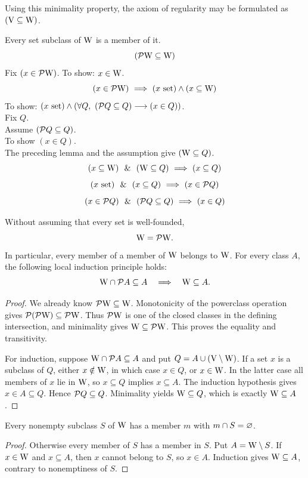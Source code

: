 \begin{note}
Using this minimality property, the axiom of regularity may be formulated as $(\mathrm{V}\subseteq\mathrm{W})$.
\end{note}
\begin{theorem}
Every set subclass of $\mathrm{W}$ is a member of it.
\[
(\mathcal{P} \mathrm{W} \subseteq \mathrm{W})
\]
\Proof
Fix $(x\in \mathcal{P} \mathrm{W})$. To show: $x\in\mathrm{W}$.
\[
(x\in \mathcal{P} \mathrm{W})
\ \Longrightarrow\ 
(x\mathrm{\ set})
\land
(x\subseteq\mathrm{W})
\]
To show: $(x\mathrm{\ set})\land(\forall Q,\ (\mathcal{P} Q\subseteq Q)\longrightarrow (x\in Q))$.\\
Fix $Q$.\\
Assume $(\mathcal{P} Q\subseteq Q)$.\\
To show $(x\in Q)$.\\
The preceding lemma and the assumption give $(\mathrm{W}\subseteq Q)$.
\[
(x\subseteq\mathrm{W})
\ \ \&\ \ 
(\mathrm{W}\subseteq Q)
\ \Longrightarrow\ 
(x\subseteq Q)
\]
\[
(x\mathrm{\ set})
\ \ \&\ \ 
(x\subseteq Q)
\ \Longrightarrow\ 
(x\in\mathcal{P} Q)
\]
\[
(x\in\mathcal{P} Q)
\ \ \&\ \ 
(\mathcal{P} Q\subseteq Q)
\ \Longrightarrow\ 
(x\in Q)
\]

\Done
\end{theorem}
\begin{theorem}
Without assuming that every set is well-founded,
\[
\mathrm{W}=\mathcal{P}\mathrm{W}.
\]
In particular, every member of a member of $\mathrm{W}$ belongs to $\mathrm{W}$.
For every class $A$, the following local induction principle holds:
\[
\mathrm{W}\cap\mathcal{P} A\subseteq A\quad\Longrightarrow\quad\mathrm{W}\subseteq A.
\]
\end{theorem}
\begin{proof}
We already know $\mathcal{P}\mathrm{W}\subseteq\mathrm{W}$. Monotonicity of the powerclass
operation gives $\mathcal{P}(\mathcal{P}\mathrm{W})\subseteq\mathcal{P}\mathrm{W}$. Thus
$\mathcal{P}\mathrm{W}$ is one of the closed classes in the defining intersection,
and minimality gives $\mathrm{W}\subseteq\mathcal{P}\mathrm{W}$. This proves the equality
and transitivity.

For induction, suppose $\mathrm{W}\cap\mathcal{P} A\subseteq A$ and put
$Q=A\cup(\mathrm{V}\setminus\mathrm{W})$. If a set $x$ is a subclass of $Q$, either
$x\notin\mathrm{W}$, in which case $x\in Q$, or $x\in\mathrm{W}$. In the latter
case all members of $x$ lie in $\mathrm{W}$, so $x\subseteq Q$ implies
$x\subseteq A$. The induction hypothesis gives $x\in A\subseteq Q$.
Hence $\mathcal{P} Q\subseteq Q$. Minimality yields $\mathrm{W}\subseteq Q$,
which is exactly $\mathrm{W}\subseteq A$.
\end{proof}

\begin{corollary}[Foundedness on W]
Every nonempty subclass $S$ of $\mathrm{W}$ has a member $m$ with
$m\cap S=\varnothing$.
\end{corollary}
\begin{proof}
Otherwise every member of $S$ has a member in $S$. Put
$A=\mathrm{W}\setminus S$. If $x\in\mathrm{W}$ and $x\subseteq A$, then $x$ cannot
belong to $S$, so $x\in A$. Induction gives $\mathrm{W}\subseteq A$, contrary
to nonemptiness of $S$.
\end{proof}

